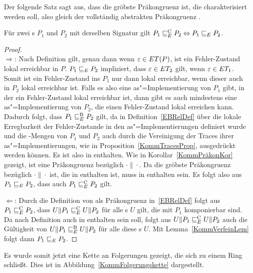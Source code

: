 Der folgende Satz sagt aus, dass \ERel{} die gröbste Präkongruenz ist, die
charakterisiert werden soll, also gleich der vollständig abstrakten
Präkongruenz \ECRel{}.

\begin{Satz}
  \label{KommVollAbstraktSatz}
  Für zwei \MEIO{}s $P_1$ und $P_2$ mit derselben Signatur gilt $P_1 \sqsubseteq  _E^\mathrm{C}
  P_2\Leftrightarrow P_1 \sqsubseteq  _E{} P_2$.
\end{Satz}

\begin{proof}\mbox{}\\
  \glqq$\Rightarrow$\grqq: Nach Definition gilt, genau dann wenn
  $\varepsilon\in ET (P)$, ist ein Fehler-Zustand lokal erreichbar in $P$. $P_1
   \sqsubseteq  _E P_2$ impliziert, dass $\varepsilon\in ET _2$ gilt, wenn
  $\varepsilon\in ET _1$. Somit ist ein Fehler-Zustand ins $P_1$ nur dann lokal
  erreichbar, wenn dieser auch in $P_2$ lokal erreichbar ist. Falls es also
  eine as"=Implementierung von $P_1$ gibt, in der ein Fehler-Zustand lokal
  erreichbar ist, dann gibt es auch mindestens eine as"=Implementierung von
  $P_2$, die einen Fehler-Zustand lokal erreichen kann. Dadurch folgt,
  dass $P_1 \sqsubseteq  _E^\mathrm{B} P_2$ gilt, da \EBRel{} in Definition~\ref{EBRelDef} über die
  lokale Erregbarkeit der Fehler-Zustande in den as"=Implementierungen
  definiert wurde und die \ET{}-Mengen von $P_1$ und $P_2$ auch durch die
  Vereinigung der Traces ihrer as"=Implementierungen, wie in
  Proposition~\ref{KommTracesProp}, ausgedrückt werden können. Es ist also
  \ERel{} in \EBRel{} enthalten. Wie in Korollar~\ref{KommPräkonKor} gezeigt,
  ist \ERel{} eine Präkongruenz bezüglich $\cdot\|\cdot$. Da \ECRel{} die
  gröbste Präkongruenz bezüglich $\cdot\|\cdot$ ist, die in \EBRel{} enthalten
  ist, muss \ERel{} in \ECRel{} enthalten sein. Es folgt also aus $P_1 \sqsubseteq  _E{}
  P_2$, dass auch $P_1 \sqsubseteq  _E^\mathrm{C}{} P_2$ gilt.

  \glqq$\Leftarrow$\grqq: Durch die Definition von \ECRel{} als Präkongruenz
  in~\ref{EBRelDef} folgt aus $P_1 \sqsubseteq  _E^\mathrm{C}{} P_2$, dass $U\|P_1 \sqsubseteq  _E^\mathrm{C} U\|P_2$ für
  alle \MEIO{}s $U$ gilt, die mit $P_1$ komponierbar sind. Da \ECRel{} nach
  Definition auch in \EBRel{} enthalten sein soll, folgt aus $U\|P_1 \sqsubseteq  _E^\mathrm{C}{}
  U\|P_2$ auch die Gültigkeit von $U\|P_1 \sqsubseteq  _E^\mathrm{B}{}U\|P_2$ für alle diese
  \MEIO{}s $U$. Mit Lemma~\ref{KommVerfeinLem} folgt dann $P_1 \sqsubseteq  _E{} P_2$.
\end{proof}

Es wurde somit jetzt eine Kette an Folgerungen gezeigt, die sich zu einem Ring
schließt. Dies ist in Abbildung~\ref{KommFolgerungskette} dargestellt.

